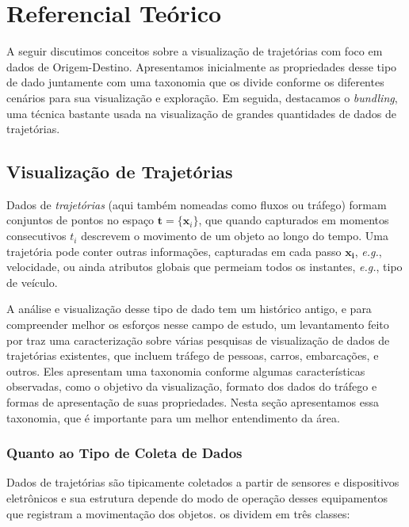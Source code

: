 
\chapter{Referencial Teórico}
\label{cap:referencial-teorico}

  A seguir discutimos conceitos sobre a visualização de trajetórias com foco em
dados de Origem-Destino. Apresentamos inicialmente as propriedades desse tipo de
dado juntamente com uma taxonomia que os divide conforme os diferentes cenários
para sua visualização e exploração. Em seguida, destacamos o \emph{bundling},
uma técnica bastante usada na visualização de grandes quantidades de dados de
trajetórias.

\section{Visualização de Trajetórias}
\label{sec:dados-de-trajetorias}

Dados de \emph{trajetórias} (aqui também nomeadas como fluxos ou tráfego)
formam conjuntos de pontos no espaço $\mathbf{t} = \{\mathbf{x}_i\}$, que quando
capturados em momentos consecutivos $t_i$ descrevem o movimento de um objeto ao
longo do tempo. Uma trajetória pode conter outras informações, capturadas em
cada passo $\mathbf{x_i}$, \emph{e.g.}, velocidade, ou ainda atributos globais
que permeiam todos os instantes, \emph{e.g.}, tipo de veículo.

A análise e visualização desse tipo de dado tem um histórico antigo, e para
compreender melhor os esforços nesse campo de estudo, um levantamento feito por
\citet{Chen2015} traz uma caracterização sobre várias pesquisas de visualização
de dados de trajetórias existentes, que incluem tráfego de pessoas, carros,
embarcações, e outros. Eles apresentam uma taxonomia conforme algumas
características observadas, como o objetivo da visualização, formato dos dados
do tráfego e formas de apresentação de suas propriedades. Nesta seção
apresentamos essa taxonomia, que é importante para um melhor entendimento da
área.

\subsection{Quanto ao Tipo de Coleta de Dados}

Dados de trajetórias são tipicamente coletados a partir de sensores e
dispositivos eletrônicos e sua estrutura depende do modo de operação desses
equipamentos que registram a movimentação dos objetos. \citet{Chen2015} os dividem em três classes:

